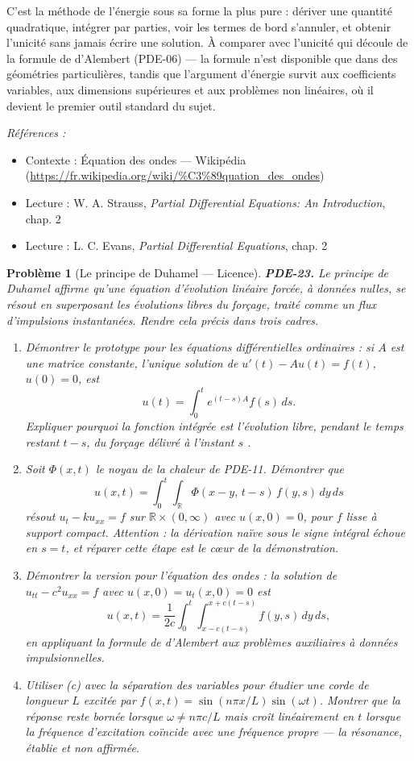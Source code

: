\documentclass[11pt]{article}
\newtheorem{problem}{Problème}
\newenvironment{refs}{\par\small\noindent\emph{Références :}\begin{itemize}\setlength\itemsep{0pt}}{\end{itemize}\normalsize}
\begin{document}
\noindent C'est la méthode de l'énergie sous sa forme la plus pure : dériver une
quantité quadratique, intégrer par parties, voir les termes de bord s'annuler, et obtenir
l'unicité sans jamais écrire une solution. À comparer avec l'unicité qui
découle de la formule de d'Alembert (PDE-06) --- la formule n'est disponible que dans des
géométries particulières, tandis que l'argument d'énergie survit aux coefficients variables,
aux dimensions supérieures et aux problèmes non linéaires, où il devient le premier
outil standard du sujet.

\begin{refs}
\item Contexte : Équation des ondes --- Wikipédia (\url{https://fr.wikipedia.org/wiki/%C3%89quation_des_ondes})
\item Lecture : W. A. Strauss, \textit{Partial Differential Equations: An Introduction}, chap. 2
\item Lecture : L. C. Evans, \textit{Partial Differential Equations}, chap. 2
\end{refs}

\bigskip

\begin{problem}[{Le principe de Duhamel --- Licence}]
\textbf{PDE-23.} Le principe de Duhamel affirme qu'une équation d'évolution linéaire
forcée, à données nulles, se résout en superposant les évolutions libres du
forçage, traité comme un flux d'impulsions instantanées. Rendre cela précis dans trois
cadres.
\begin{enumerate}
\item[(a)] Démontrer le prototype pour les équations différentielles ordinaires : si $A$ est une
matrice constante, l'unique solution de
$u'(t) - Au(t) = f(t)$, $u(0) = 0$, est
\[ u(t) = \int_0^t e^{(t-s)A} f(s)\,ds. \]
Expliquer pourquoi la fonction intégrée est \og{} l'évolution libre, pendant le temps restant
$t-s$, du forçage délivré à l'instant $s$ \fg{}.
\item[(b)] Soit $\Phi(x,t)$ le noyau de la chaleur de PDE-11. Démontrer que
\[ u(x,t) = \int_0^t \int_{\mathbb{R}} \Phi(x-y,\,t-s)\,f(y,s)\,dy\,ds \]
résout $u_t - k u_{xx} = f$ sur $\mathbb{R}\times(0,\infty)$ avec $u(x,0)=0$,
pour $f$ lisse à support compact. Attention : la dérivation naïve
sous le signe intégral échoue en $s = t$, et réparer cette étape est le c\oe{}ur de la
démonstration.
\item[(c)] Démontrer la version pour l'équation des ondes : la solution de $u_{tt} - c^2 u_{xx} = f$
avec $u(x,0) = u_t(x,0) = 0$ est
\[ u(x,t) = \frac{1}{2c}\int_0^t \int_{x-c(t-s)}^{x+c(t-s)} f(y,s)\,dy\,ds, \]
en appliquant la formule de d'Alembert aux problèmes auxiliaires à données impulsionnelles.
\item[(d)] Utiliser (c) avec la séparation des variables pour étudier une corde de longueur $L$
excitée par $f(x,t) = \sin(n\pi x/L)\sin(\omega t)$. Montrer que la réponse reste
bornée lorsque $\omega \ne n\pi c/L$ mais croît linéairement en $t$ lorsque la fréquence
d'excitation coïncide avec une fréquence propre --- la résonance, établie et non affirmée.
\end{enumerate}

\end{problem}
\end{document}
